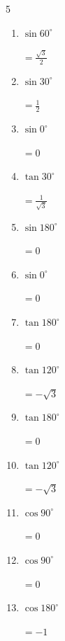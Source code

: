\begin{multicols}{5}
\begin{enumerate}
        $\displaystyle =-\frac{1}{\sqrt{3}}$

  \item $\displaystyle \sin{60^\circ}$

        $\displaystyle =\frac{\sqrt{3}}{2}$

  \item $\displaystyle \sin{30^\circ}$

        $\displaystyle =\frac{1}{2}$

  \item $\displaystyle \sin{0^\circ}$

        $\displaystyle =0$

  \item $\displaystyle \tan{30^\circ}$

        $\displaystyle =\frac{1}{\sqrt{3}}$

  \item $\displaystyle \sin{180^\circ}$

        $\displaystyle =0$

  \item $\displaystyle \sin{0^\circ}$

        $\displaystyle =0$

  \item $\displaystyle \tan{180^\circ}$

        $\displaystyle =0$

\columnbreak %

  \item $\displaystyle \tan{120^\circ}$

        $\displaystyle =-\sqrt{3}$

  \item $\displaystyle \tan{180^\circ}$

        $\displaystyle =0$

  \item $\displaystyle \tan{120^\circ}$

        $\displaystyle =-\sqrt{3}$

  \item $\displaystyle \cos{90^\circ}$

        $\displaystyle =0$

  \item $\displaystyle \cos{90^\circ}$

        $\displaystyle =0$

  \item $\displaystyle \cos{180^\circ}$

        $\displaystyle =-1$


\end{enumerate}
\end{multicols}

